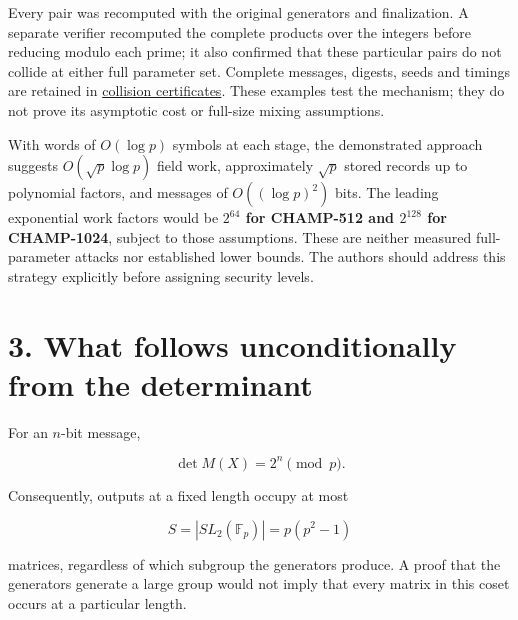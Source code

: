 \documentclass[
  english,
  11pt,
  a4paper,
]{article}
\begin{document}
Every pair was recomputed with the original generators and finalization.
A separate verifier recomputed the complete products over the integers
before reducing modulo each prime; it also confirmed that these
particular pairs do not collide at either full parameter set. Complete
messages, digests, seeds and timings are retained in
\href{data/collisions.json}{collision certificates}. These examples test
the mechanism; they do not prove its asymptotic cost or full-size mixing
assumptions.

With words of \(O(\log p)\) symbols at each stage, the demonstrated
approach suggests \(O(\sqrt p\log p)\) field work, approximately
\(\sqrt p\) stored records up to polynomial factors, and messages of
\(O((\log p)^2)\) bits. The leading exponential work factors would be
\textbf{\(2^{64}\) for CHAMP-512 and \(2^{128}\) for CHAMP-1024},
subject to those assumptions. These are neither measured full-parameter
attacks nor established lower bounds. The authors should address this
strategy explicitly before assigning security levels.



\section{3. What follows unconditionally from the
determinant}\label{what-follows-unconditionally-from-the-determinant}


For an \(n\)-bit message,

\[
\det M(X)=2^n\pmod p.
\]


Consequently, outputs at a fixed length occupy at most

\[
S=|SL_2(\mathbb F_p)|=p(p^2-1)
\]

matrices, regardless of which subgroup the generators produce. A proof
that the generators generate a large group would not imply that every
matrix in this coset occurs at a particular length.

\end{document}
